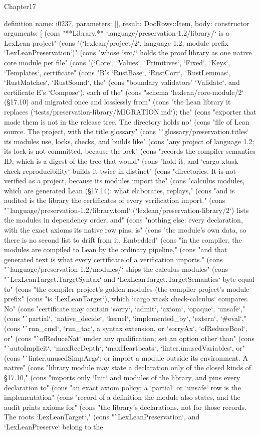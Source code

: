 \begin{lexlean}{Chapter17}
\begin{semanticmodule}
definition{
  name: i0237,
  parameters: [],
  result: DocRows::Item,
  body: constructor{
    arguments: [
      (cons "**Library.** `language/preservation-1.2/library/` is a LexLean project" (cons "(`lexlean/project/2`, language 1.2, module prefix `LexLeanPreservation`)" (cons "whose `src/` holds the proof library as one native core module per file" (cons "(`Core`, `Values`, `Primitives`, `Fixed`, `Keys`, `Templates`, certificate" (cons "B's `RustBase`, `RustCorr`, `RustLemmas`, `RustMatches`, `RustSound`, the" (cons "boundary validators' `Validate`, and certificate E's `Compose`), each of the" (cons "schema `lexlean/core-module/2` (§17.10) and migrated once and losslessly from" (cons "the Lean library it replaces (`tests/preservation-library/MIGRATION.md`); the" (cons "exporter that made them is not in the release tree. The directory holds no" (cons "file of Lean source. The project, with the title glossary" (cons "`glossary/preservation.titles` its modules use, locks, checks, and builds like" (cons "any project of language 1.2; its lock is not committed, because the lock" (cons "records the compiler-semantics ID, which is a digest of the tree that would" (cons "hold it, and `cargo xtask check-reproducibility` builds it twice in distinct" (cons "directories. It is not verified as a project, because its modules import the" (cons "calculus modules, which are generated Lean (§17.14): what elaborates, replays," (cons "and is audited is the library the certificates of every verification import." (cons "`language/preservation-1.2/library.toml` (`lexlean/preservation-library/2`) lists the modules in dependency order, and" (cons "nothing else: every declaration, with the exact axioms its native row pins, is" (cons "the module's own data, so there is no second list to drift from it. Embedded" (cons "in the compiler, the modules are compiled to Lean by the ordinary pipeline," (cons "and that generated text is what every certificate of a verification imports." (cons "`language/preservation-1.2/modules/` ships the calculus modules" (cons "`LexLeanTarget.TargetSyntax` and `LexLeanTarget.TargetSemantics` byte-equal to" (cons "the compiler project's golden modules (the compiler project's module prefix" (cons "is `LexLeanTarget`), which `cargo xtask check-calculus` compares. No" (cons "certificate may contain `sorry`, `admit`, `axiom`, `opaque`, `unsafe`," (cons "`partial`, `native_decide`, `kernel`, `implemented_by`, `extern`, `#eval`," (cons "`run_cmd`, `run_tac`, a syntax extension, or `sorryAx`, `ofReduceBool`, or" (cons "`ofReduceNat` under any qualification; set an option other than" (cons "`autoImplicit`, `maxRecDepth`, `maxHeartbeats`, `linter.unusedVariables`, or" (cons "`linter.unusedSimpArgs`; or import a module outside its environment. A native" (cons "library module may state a declaration only of the closed kinds of §17.10," (cons "imports only `Init` and modules of the library, and pins every declaration to" (cons "an exact axiom policy; a `partial` or `unsafe` row is the implementation" (cons "record of a definition the module also states, and the audit prints axioms for" (cons "the library's declarations, not for those records. The roots `LexLeanTarget`," (cons "`LexLeanPreservation`, and `LexLeanPreserve` belong to the }}
\end{semanticmodule}
\end{lexlean}
